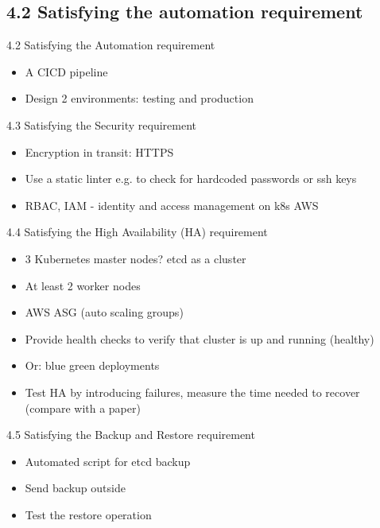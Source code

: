 \documentclass{beamer}
\begin{document}
\subsection{4.2 Satisfying the automation requirement}
\begin{frame}{4.2 Satisfying the Automation requirement}%
\begin{itemize}
	\item A CICD pipeline
	\item Design 2 environments: testing and production 
\end{itemize}
\end{frame}
\begin{frame}{4.3 Satisfying the Security requirement}%
	\begin{itemize}
		\item Encryption in transit: HTTPS
		\item Use a static linter e.g. to check for hardcoded passwords or ssh keys
		\item RBAC, IAM - identity and access management on k8s AWS
	\end{itemize}
\end{frame}
\begin{frame}{4.4 Satisfying the High Availability (HA) requirement}%
\begin{itemize}
	\item 3 Kubernetes master nodes? etcd as a cluster
	\item At least 2 worker nodes
	\item AWS ASG (auto scaling groups)
	\item Provide health checks to verify that cluster is up and running (healthy)
	\item Or: blue green deployments
	\item Test HA by introducing failures, measure the time needed to recover (compare with a paper)
\end{itemize}
\end{frame}

\begin{frame}{4.5 Satisfying the Backup and Restore  requirement}%
\begin{itemize}
	\item Automated script for etcd backup 
	\item Send backup outside
	\item Test the restore operation
\end{itemize}
\end{frame}
\end{document}
